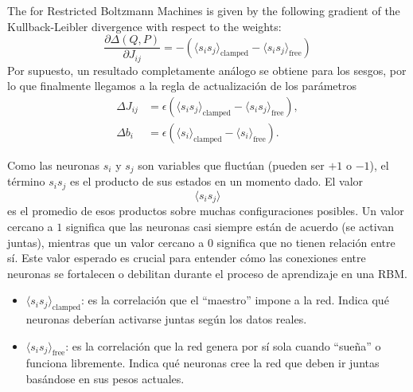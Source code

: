 \begin{prop}
    The  for Restricted Boltzmann Machines is given by the following gradient of the Kullback-Leibler divergence with respect to the weights:
    \begin{equation*}
        \frac{\partial \Delta(Q, P)}{\partial J_{ij}} = -\left( \langle s_i s_j \rangle_{\text{clamped}} - \langle s_i s_j \rangle_{\text{free}} \right)
    \end{equation*}
    Por supuesto, un resultado completamente análogo se obtiene para los sesgos, por lo que finalmente llegamos a la regla de actualización de los parámetros
    \begin{align*}
        \Delta J_{ij} &= \epsilon \left( \langle s_i s_j \rangle_{\text{clamped}} - \langle s_i s_j \rangle_{\text{free}} \right), \\
        \Delta b_i &= \epsilon \left( \langle s_i \rangle_{\text{clamped}} - \langle s_i \rangle_{\text{free}} \right).
    \end{align*}
\end{prop}

\begin{observacion}
    Como las neuronas $s_i$ y $s_j$ son variables que fluctúan (pueden ser $+1$ o $-1$), el término $s_i s_j$ es el producto de sus estados en un momento dado. El valor
    \begin{equation*}
        \langle s_i s_j \rangle
    \end{equation*}
    es el promedio de esos productos sobre muchas configuraciones posibles. Un valor cercano a $1$ significa que las neuronas casi siempre están de acuerdo (se activan juntas), mientras que un valor cercano a $0$ significa que no tienen relación entre sí. Este valor esperado es crucial para entender cómo las conexiones entre neuronas se fortalecen o debilitan durante el proceso de aprendizaje en una RBM.
    \begin{itemize}
        \item $\langle s_i s_j \rangle_{\text{clamped}}$: es la correlación que el ``maestro'' impone a la red. Indica qué neuronas deberían activarse juntas según los datos reales.
        \item $\langle s_i s_j \rangle_{\text{free}}$: es la correlación que la red genera por sí sola cuando ``sueña'' o funciona libremente. Indica qué neuronas cree la red que deben ir juntas basándose en sus pesos actuales.
    \end{itemize}
\end{observacion}

